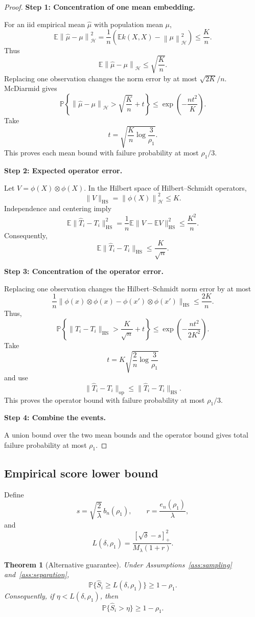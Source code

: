 \documentclass[11pt]{article}
\newcommand{\HH}{\mathcal H}
\newcommand{\E}{\mathbb E}
\newcommand{\Prob}{\mathbb P}
\newcommand{\norm}[1]{\left\lVert #1\right\rVert_{\HH}}
\newcommand{\proofstep}[1]{%
  \par\smallskip
  \noindent\textbf{#1}\enspace\ignorespaces
}
\newtheorem{theorem}{Theorem}
\begin{document}
\begin{proof}
\proofstep{Step 1: Concentration of one mean embedding.}
For an iid empirical mean $\widehat\mu$ with population
mean $\mu$,
\[
\E\norm{\widehat\mu-\mu}^2
=\frac1n\left(\E k(X,X)-\norm{\mu}^2\right)
\le\frac Kn.
\]
Thus
\[
\E\norm{\widehat\mu-\mu}\le\sqrt{\frac Kn}.
\]
Replacing one observation changes the norm error by
at most $\sqrt{2K}/n$. McDiarmid gives
\[
\Prob\left\{
\norm{\widehat\mu-\mu}>\sqrt{\frac Kn}+t
\right\}
\le\exp\left(-\frac{nt^2}{K}\right).
\]
Take
\[
t=\sqrt{\frac Kn\log\frac3{\rho_1}}.
\]
This proves each mean bound with failure probability
at most $\rho_1/3$.

\proofstep{Step 2: Expected operator error.}
Let $V=\phi(X)\otimes\phi(X)$.
In the Hilbert space of Hilbert--Schmidt operators,
\[
\|V\|_{\mathrm{HS}}=\norm{\phi(X)}^2\le K.
\]
Independence and centering imply
\[
\E\|\widehat T_i-T_i\|_{\mathrm{HS}}^2
=\frac1n\E\|V-\E V\|_{\mathrm{HS}}^2
\le\frac{K^2}{n}.
\]
Consequently,
\[
\E\|\widehat T_i-T_i\|_{\mathrm{HS}}
\le\frac K{\sqrt n}.
\]

\proofstep{Step 3: Concentration of the operator error.}
Replacing one observation changes the Hilbert--Schmidt
norm error by at most
\[
\frac1n
\|\phi(x)\otimes\phi(x)-\phi(x')\otimes\phi(x')\|_{\mathrm{HS}}
\le\frac{2K}{n}.
\]
Thus,
\[
\Prob\left\{
\|\widehat T_i-T_i\|_{\mathrm{HS}}
>\frac K{\sqrt n}+t
\right\}
\le\exp\left(-\frac{nt^2}{2K^2}\right).
\]
Take
\[
t=K\sqrt{\frac2n\log\frac3{\rho_1}}
\]
and use
\[
\|\widehat T_i-T_i\|_{\mathrm{op}}
\le\|\widehat T_i-T_i\|_{\mathrm{HS}}.
\]
This proves the operator bound with failure probability
at most $\rho_1/3$.

\proofstep{Step 4: Combine the events.}
A union bound over the two mean bounds and the operator
bound gives total failure probability at most $\rho_1$.
\end{proof}

\subsection{Empirical score lower bound}

Define
\[
s
=\sqrt{\frac2\lambda}\,b_n(\rho_1),
\qquad
r=\frac{e_n(\rho_1)}{\lambda},
\]
and
\begin{equation}
L(\delta,\rho_1)
=
\frac{[\sqrt\delta-s]_+^2}
{M_\lambda(1+r)}.
\label{eq:Lstd}
\end{equation}

\begin{theorem}[Alternative guarantee]
\label{thm:standard}
Under Assumptions~\ref{ass:sampling}
and~\ref{ass:separation},
\[
\Prob\{\widehat S_i\ge
L(\delta,\rho_1)\}\ge1-\rho_1.
\]
Consequently, if $\eta<L(\delta,\rho_1)$,
then
\[
\Prob\{\widehat S_i>\eta\}\ge1-\rho_1.
\]
\end{theorem}
\end{document}
